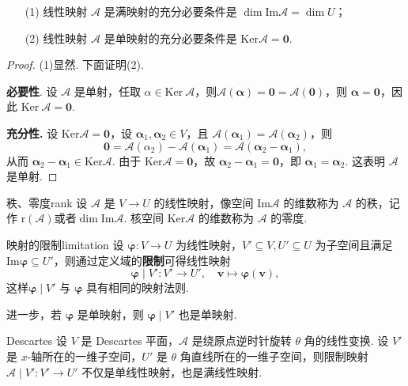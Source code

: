 \documentclass[12pt, a4paper,newtx]{ctexart}
\begin{document}
\begin{theorem}{}{}
	\begin{enumerate}
		\item[(1)] 线性映射 $\mathcal A$ 是满映射的充分必要条件是 $\dim \text{Im} \mathcal A = \dim U$；
		\item[(2)] 线性映射 $\mathcal A$ 是单映射的充分必要条件是 $\text{Ker} \mathcal A = \bm 0$. 
	\end{enumerate}
\end{theorem}
\begin{proof}
	(1)显然. 下面证明(2).
	
	\textbf{必要性}. 设 $\mathcal{A}$ 是单射，任取 $\alpha \in \text{Ker} \ \mathcal{A}$，则$\mathcal{A}(\bm\alpha) = \bm 0 = \mathcal{A}(\bm 0)$，则 $\bm\alpha = \bm 0$，因此 $\text{Ker} \ \mathcal{A} = \bm 0$. 
	
	\textbf{充分性. }设 $\text{Ker}\mathcal{A} = \bm 0$，设 $\bm\alpha_1, \bm\alpha_2 \in V$，且 $\mathcal{A}(\bm\alpha_1) = \mathcal{A}(\bm\alpha_2)$，则
	\[
	\bm 0 = \mathcal{A}(\alpha_2) - \mathcal{A}(\bm\alpha_1) = \mathcal{A}(\bm\alpha_2 - \bm\alpha_1),
	\]
	从而 $\bm\alpha_2 - \bm\alpha_1 \in \text{Ker} \mathcal{A}$. 由于 $\text{Ker}\mathcal{A} = \bm 0$，故 $\bm\alpha_2 - \bm\alpha_1 = \bm 0$，即 $\bm\alpha_1 = \bm\alpha_2$. 这表明 $\mathcal{A}$ 是单射. 
\end{proof}
\begin{definition}{秩、零度}{rank}\kaishu 
	设 $\mathcal{A}$ 是 $V \rightarrow U$ 的线性映射，像空间 $\text{Im}\mathcal{A}$ 的维数称为 $\mathcal{A}$ 的{\heiti 秩}，记作 $\mathrm r(\mathcal{A})$或者$\dim\mathrm{Im}\mathcal A$. 核空间 $\text{Ker}\mathcal{A}$ 的维数称为 $\mathcal{A}$ 的{\heiti 零度}. 
\end{definition}
\begin{definition}{映射的限制}{limitation}\kaishu 
	设 $\bm\varphi: V \rightarrow U$ 为线性映射，$V' \subseteq V, U' \subseteq U$ 为子空间且满足 $\mathrm{Im}\bm\varphi \subseteq U'$，则通过定义域的\textbf{限制}可得线性映射 \[\bm\varphi\mid V': V' \rightarrow U',\quad\bm v\mapsto\bm\varphi(\bm v),\]这样$\bm\varphi\mid V'$ 与 $\bm\varphi$ 具有相同的映射法则. 
\end{definition}
进一步，若 $\bm\varphi$ 是单映射，则 $\bm\varphi\mid V'$ 也是单映射. 
\begin{example}{}{Descartes}
	设 $V$ 是 Descartes 平面，$\mathscr A$ 是绕原点逆时针旋转 $\theta$ 角的线性变换. 
	设 $V'$ 是 $x$-轴所在的一维子空间，$U'$ 是 $\theta$ 角直线所在的一维子空间，则限制映射$\mathscr A\mid V': V' \rightarrow U'$ 不仅是单线性映射，也是满线性映射. 
\end{example}
\end{document}
